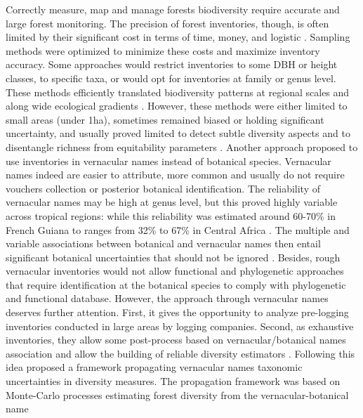\documentclass[
  11pt,
  french,
  A4paper,
  extrafontsizes,onecolumn,openright
  ]{memoir}
\begin{document}
Correctly measure, map and manage forests biodiversity require accurate
and large forest monitoring. The precision of forest inventories,
though, is often limited by their significant cost in terms of time,
money, and logistic \autocites{Feeley2011}{Baraloto2013}. Sampling
methods were optimized to minimize these costs and maximize inventory
accuracy. Some approaches would restrict inventories to some DBH or
height classes, to specific taxa, or would opt for inventories at family
or genus level. These methods efficiently translated biodiversity
patterns at regional scales and along wide ecological gradients
\autocites{Steege2000}{Higgins2004}{Rejou-Mechain2011}{Pos2014}.
However, these methods were either limited to small areas (under 1ha),
sometimes remained biased or holding significant uncertainty, and
usually proved limited to detect subtle diversity aspects and to
disentangle richness from equitability parameters
\autocites{Phillips2003a}{Baraloto2013}[
]{Guitet2014b}{Vellend2008}{Prance1994}. Another approach proposed to
use inventories in vernacular names instead of botanical species.
Vernacular names indeed are easier to attribute, more common and usually
do not require vouchers collection or posterior botanical
identification. The reliability of vernacular names may be high at genus
level, but this proved highly variable across tropical regions: while
this reliability was estimated around 60-70\% in French Guiana
\autocites{Hawes2012}{Guitet2014b} to ranges from 32\% to 67\% in
Central Africa \autocite{Rejou-Mechain2011}. The multiple and variable
associations between botanical and vernacular names then entail
significant botanical uncertainties that should not be ignored
\autocite{Oldeman1968}. Besides, rough vernacular inventories would not
allow functional and phylogenetic approaches that require identification
at the botanical species to comply with phylogenetic and functional
database. However, the approach through vernacular names deserves
further attention. First, it gives the opportunity to analyze
pre-logging inventories conducted in large areas by logging companies.
Second, as exhaustive inventories, they allow some post-process based on
vernacular/botanical names association and allow the building of
reliable diversity estimators
\autocites{TerSteege2006}{Feldpausch2006}{Rejou-Mechain2008}{Rejou-Mechain2011}.
Following this idea \textcite{Guitet2014b} proposed a framework
propagating vernacular names taxonomic uncertainties in diversity
measures. The propagation framework was based on Monte-Carlo processes
estimating forest diversity from the vernacular-botanical name
\end{document}
